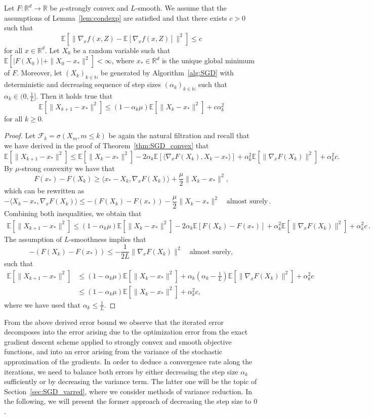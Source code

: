 \documentclass[12pt,openany]{book}
\theoremstyle{definition}
\theoremstyle{definition}
\newcommand{\cF}{\mathcal{F}}
\newcommand{\E}{\mathbb{E}}
\newcommand{\N}{\mathbb{N}}
\newcommand{\R}{\mathbb{R}}
\begin{document}
\begin{thm}\label{thm:SGD_strngconvex}
Let $F:\R^d\to\R$ be $\mu$-strongly convex and $L$-smooth. We assume that the assumptions of Lemma~\ref{lem:condexp} are satisfied and that there exists $c>0$ such that
\[\E[\|\nabla_x f(x,Z) - \E[\nabla_x f(x,Z)] \|^2] \le c \]
for all $x\in\R^d$. Let $X_0$ be a random variable such that $\E[|F(X_0)| + \|X_0-x_\ast\|^2]<\infty$, where $x_\ast\in\R^d$ is the unique global minimum of $F$. Moreover, let $(X_k)_{k\in\N}$ be generated by Algorithm~\ref{alg:SGD} with deterministic and decreasing sequence of step sizes $(\alpha_k)_{k\in\N}$ such that $\alpha_k\in(0,\frac1L]$. Then it holds true that
\[\E[\|X_{k+1}-x_\ast\|^2] \le (1-\alpha_k \mu) \E[\|X_k-x_\ast\|^2] + c\alpha_k^2 \]
for all $k\ge0$.
\end{thm}
\begin{proof}
Let $\cF_k=\sigma(X_m,m\le k)$ be again the natural filtration and recall that we have derived in the proof of Theorem~\ref{thm:SGD_convex} that
\[\E[\|X_{k+1}-x_\ast\|^2] \le \E[\|X_k-x_\ast\|^2] - 2\alpha_k \E[\langle \nabla_x F(X_k), X_k-x_\ast\rangle ] + \alpha_k^2\E[\|\nabla_x F(X_k)\|^2] + \alpha_k^2 c. \]
By $\mu$-strong convexity we have that
\[F(x_\ast) - F(X_k) \ge \langle x_\ast-X_k,\nabla_x F(X_k)\rangle + \frac{\mu}2\|X_k-x_\ast\|^2, \]
which can be rewritten as
\[-\langle X_k-x_\ast, \nabla_x F(X_k)\rangle\le -\left(F(X_k)-F(x_\ast)\right) - \frac{\mu}2\|X_{k}-x_\ast\|^2 \quad \text{almost surely}\, .  \]
Combining both inequalities, we obtain that
\begin{align*}
\E[\|X_{k+1}-x_\ast\|^2] \le (1-\alpha_k\mu)\E[\|X_k-x_\ast\|^2] - 2\alpha_k\E[F(X_k)-F(x_\ast)] + \alpha_k^2\E[\|\nabla_x F(X_k)\|^2] + \alpha_k^2 c\, .
\end{align*}
The assumption of $L$-smoothness implies that
\[-(F(X_k)-F(x_\ast)) \le -\frac{1}{2L}\|\nabla_x F(X_k)\|^2\quad \text{almost surely}, \]
such that 
\begin{align*}
\E[\|X_{k+1}-x_\ast\|^2] &\le (1-\alpha_k\mu)\E[\|X_k-x_\ast\|^2] + \alpha_k (\alpha_k-\frac{1}{L})\E[\|\nabla_x F(X_k)\|^2] + \alpha_k^2 c\\
&\le (1-\alpha_k\mu) \E[\|X_k-x_\ast\|^2] + \alpha_k^2 c,
\end{align*}
where we have used that $\alpha_k\le \frac1L$.
\end{proof}

From the above derived error bound we observe that the iterated error decomposes into the error arising due to the optimization error from the exact gradient descent scheme applied to strongly convex and smooth objective functions, and into an error arising from the variance of the stochastic approximation of the gradients. In order to deduce a convergence rate along the iterations, we need to balance both errors by either decreasing the step size $\alpha_k$ sufficiently or by decreasing the variance term. The latter one will be the topic of Section~\ref{sec:SGD_varred}, where we consider methods of variance reduction. In the following, we will present the former approach of decreasing the step size to $0$. 
\end{document}
